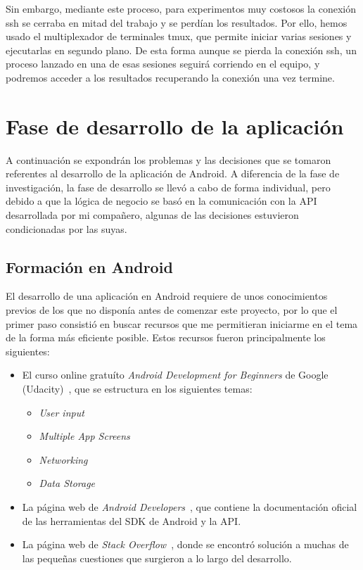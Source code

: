 Sin embargo, mediante este proceso, para experimentos muy costosos la conexión ssh se cerraba en mitad del trabajo y se perdían los resultados. Por ello, hemos usado el multiplexador de terminales tmux, que permite iniciar varias sesiones y ejecutarlas en segundo plano. De esta forma aunque se pierda la conexión ssh, un proceso lanzado en una de esas sesiones seguirá corriendo en el equipo, y podremos acceder a los resultados recuperando la conexión una vez termine. 

\section{Fase de desarrollo de la aplicación}

A continuación se expondrán los problemas y las decisiones que se tomaron referentes al desarrollo de la aplicación de Android. A diferencia de la fase de investigación, la fase de desarrollo se llevó a cabo de forma individual, pero debido a que la lógica de negocio se basó en la comunicación con la API desarrollada por mi compañero, algunas de las decisiones estuvieron condicionadas por las suyas. 

\subsection{Formación en Android}

El desarrollo de una aplicación en Android requiere de unos conocimientos previos de los que no disponía antes de comenzar este proyecto, por lo que el primer paso consistió en buscar recursos que me permitieran iniciarme en el tema de la forma más eficiente posible. Estos recursos fueron principalmente los siguientes: 

\begin{itemize}
	\item El curso online gratuíto \textit{Android Development for Beginners} de Google (Udacity)~\cite{udacity}, que se estructura en los siguientes temas: 
	
	\begin{minipage}{\linewidth}
	\begin{itemize}
		\item \textit{User input}
		\item \textit{Multiple App Screens}
		\item \textit{Networking}
		\item \textit{Data Storage} 
	\end{itemize}
	\end{minipage}
	\item La página web de \textit{Android Developers}~\cite{androiddevelopers}, que contiene la documentación oficial de las herramientas del SDK de Android y la API. 
	\item La página web de \textit{Stack Overflow}~\cite{stackoverflow}, donde se encontró solución a muchas de las pequeñas cuestiones que surgieron a lo largo del desarrollo. 
\end{itemize}

